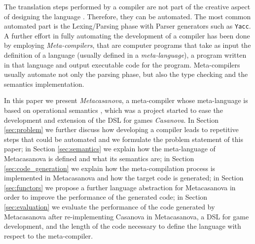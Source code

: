 The translation steps performed by a compiler are not part of the creative aspect of designing the language \cite{book1970cwic, czarnecki2000generative}. Therefore, they can be automated. The most common automated part is the Lexing/Parsing phase with Parser generators such as \texttt{Yacc}. A further effort in fully automating the development of a compiler has been done by employing \textit{Meta-compilers}, that are computer programs that take as input the definition of a language (usually defined in a \textit{meta-language}), a program written in that language and output executable code for the program. Meta-compilers usually automate not only the parsing phase, but also the type checking and the semantics implementation.
 
In this paper we present \textit{Metacasanova}, a meta-compiler whose meta-language is based on operational semantics \cite{plotkin1981, kahn1987natural}, which was a project started to ease the development and extension of the DSL for games \textit{Casanova}. In Section \ref{sec:problem} we further discuss how developing a compiler leads to repetitive steps that could be automated and we formulate the problem statement of this paper; in Section \ref{sec:semantics} we explain how the meta-language of Metacasanova is defined and what its semantics are; in Section \ref{sec:code_generation} we explain how the meta-compilation process is implemented in Metacasanova and how the target code is generated; in Section \ref{sec:functors} we propose a further language abstraction for Metacasanova in order to improve the performance of the generated code; in Section \ref{sec:evaluation} we evaluate the performance of the code generated by Metacasanova after re-implementing Casanova \cite{abbadi2015casanova} in Metacasanova, a DSL for game development, and the length of the code necessary to define the language with respect to the meta-compiler.

